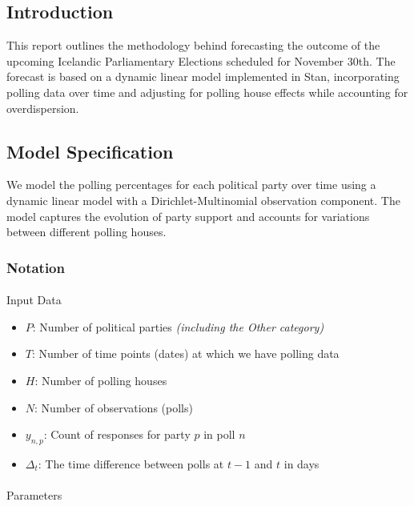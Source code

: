 \documentclass[
  letterpaper,
  DIV=11,
  numbers=noendperiod]{scrartcl}
\author{}
\date{}
\makeatletter
\let\oldparagraph\paragraph
\renewcommand{\paragraph}{
    \@ifstar
      \xxxParagraphStar
      \xxxParagraphNoStar
  }
\newcommand{\xxxParagraphStar}[1]{\oldparagraph*{#1}\mbox{}}
\newcommand{\xxxParagraphNoStar}[1]{\oldparagraph{#1}\mbox{}}
\providecommand{\tightlist}{%
  \setlength{\itemsep}{0pt}\setlength{\parskip}{0pt}}\usepackage{longtable,booktabs,array}
\makeatother
\begin{document}
\subsection{Introduction}\label{introduction}

This report outlines the methodology behind forecasting the outcome of
the upcoming Icelandic Parliamentary Elections scheduled for November
30th. The forecast is based on a dynamic linear model implemented in
Stan, incorporating polling data over time and adjusting for polling
house effects while accounting for overdispersion.

\subsection{Model Specification}\label{model-specification}

We model the polling percentages for each political party over time
using a dynamic linear model with a Dirichlet-Multinomial observation
component. The model captures the evolution of party support and
accounts for variations between different polling houses.

\subsubsection{Notation}\label{notation}

\paragraph{Input Data}\label{input-data}

\begin{itemize}
\tightlist
\item
  \(P\): Number of political parties \emph{(including the Other
  category)}
\item
  \(T\): Number of time points (dates) at which we have polling data
\item
  \(H\): Number of polling houses
\item
  \(N\): Number of observations (polls)
\item
  \(y_{n,p}\): Count of responses for party \(p\) in poll \(n\)
\item
  \(\Delta_t\): The time difference between polls at \(t-1\) and \(t\)
  in days
\end{itemize}

\paragraph{Parameters}\label{parameters}
\end{document}
